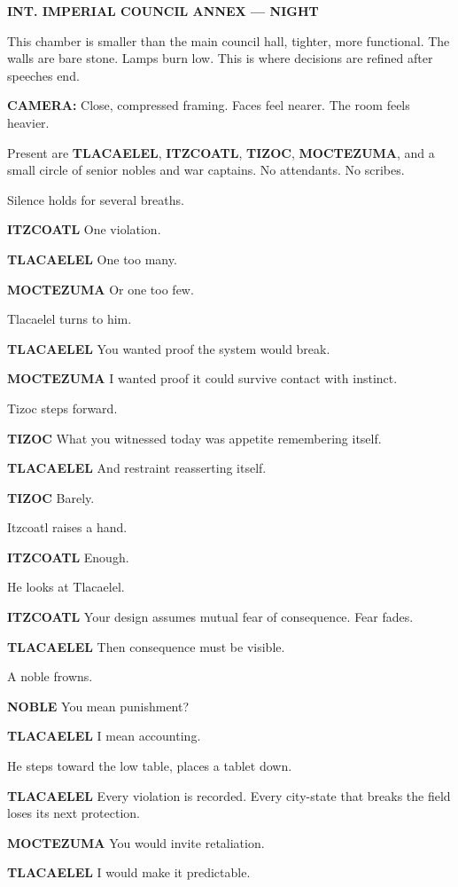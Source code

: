 \documentclass[12pt]{article}
\begin{document}
\textbf{INT. IMPERIAL COUNCIL ANNEX — NIGHT}

This chamber is smaller than the main council hall, tighter, more functional. The walls are bare stone. Lamps burn low. This is where decisions are refined after speeches end.

\textbf{CAMERA:} Close, compressed framing. Faces feel nearer. The room feels heavier.

Present are \textbf{TLACAELEL}, \textbf{ITZCOATL}, \textbf{TIZOC}, \textbf{MOCTEZUMA}, and a small circle of senior nobles and war captains. No attendants. No scribes.

Silence holds for several breaths.

\textbf{ITZCOATL}  
One violation.

\textbf{TLACAELEL}  
One too many.

\textbf{MOCTEZUMA}  
Or one too few.

Tlacaelel turns to him.

\textbf{TLACAELEL}  
You wanted proof the system would break.

\textbf{MOCTEZUMA}  
I wanted proof it could survive contact with instinct.

Tizoc steps forward.

\textbf{TIZOC}  
What you witnessed today was appetite remembering itself.

\textbf{TLACAELEL}  
And restraint reasserting itself.

\textbf{TIZOC}  
Barely.

Itzcoatl raises a hand.

\textbf{ITZCOATL}  
Enough.

He looks at Tlacaelel.

\textbf{ITZCOATL}  
Your design assumes mutual fear of consequence.  
Fear fades.

\textbf{TLACAELEL}  
Then consequence must be visible.

A noble frowns.

\textbf{NOBLE}  
You mean punishment?

\textbf{TLACAELEL}  
I mean accounting.

He steps toward the low table, places a tablet down.

\textbf{TLACAELEL}  
Every violation is recorded.  
Every city-state that breaks the field  
loses its next protection.

\textbf{MOCTEZUMA}  
You would invite retaliation.

\textbf{TLACAELEL}  
I would make it predictable.
\end{document}

